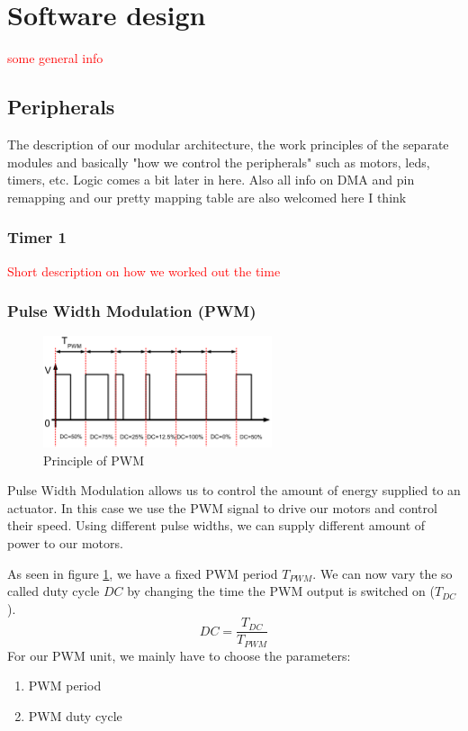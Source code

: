 \section{Software design} \label{chap:software}
\textcolor{red}{some general info}

\subsection{Peripherals} %
The description of our modular architecture, the work principles of the separate modules and basically "how we control the peripherals" such as motors, leds, timers, etc. Logic comes a bit later in here.
Also all info on DMA and pin remapping and our pretty mapping table are also welcomed here I think

\subsubsection*{Timer 1}
\textcolor{red}{
Short description on how we worked out the time
}

\subsubsection*{Pulse Width Modulation (PWM)}

\begin{figure}[htb]
    \centering
    \includegraphics[width=0.6\textwidth]{figures/software/pwm_demo.png}
    \caption {Principle of PWM \cite{alex}}
    \label{fig:pwm_demo}
\end{figure}

Pulse Width Modulation allows us to control the amount of energy supplied to an actuator. In this case we use the PWM signal to drive our motors and control their speed. Using different pulse widths, we can supply different amount of power to our motors. \cite{alex}


As seen in figure \ref{fig:pwm_demo}, we have a fixed PWM period $T_{PWM}$. We can now vary the so called duty cycle $DC$ by changing the time the PWM output is switched on ($T_{DC}$).
\begin{equation}
    DC = \frac{T_{DC}}{T_{PWM}}
\end{equation}
For our PWM unit, we mainly have to choose the parameters:
\begin{enumerate}
    \item PWM period
    \item PWM duty cycle
\end{enumerate}


